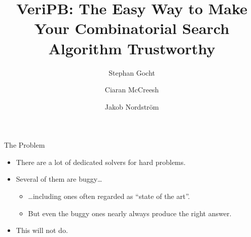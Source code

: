 \documentclass{beamer}
\author{
    Stephan Gocht
    \and Ciaran McCreesh
    \and Jakob Nordstr\"{o}m}
\title{VeriPB: The Easy Way to Make Your Combinatorial Search Algorithm Trustworthy}
\begin{document}
{
    \begin{frame}
        \titlepage
    \end{frame}
}

\begin{frame}{The Problem}
    \begin{itemize}
        \item There are a lot of dedicated solvers for hard problems.
        \item Several of them are buggy\ldots
            \begin{itemize}
                \item \ldots including ones often regarded as ``state of the art''.
                \item But even the buggy ones nearly always produce the right answer.
            \end{itemize}
        \item This will not do.
    \end{itemize}
\end{frame}
\end{document}
